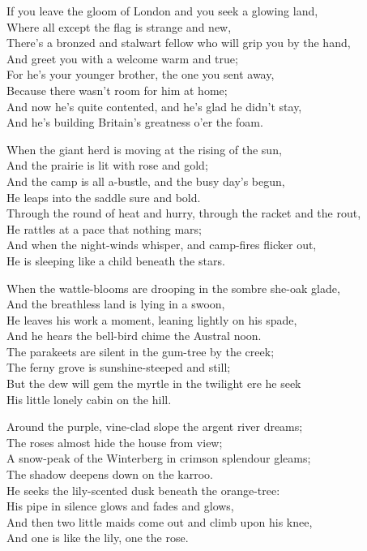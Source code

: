
\begin{poemblock}
If you leave the gloom of London and you seek a glowing land,\\
\idt Where all except the flag is strange and new,\\
There's a bronzed and stalwart fellow who will grip you by the hand,\\
\idt And greet you with a welcome warm and true;\\
For he's your younger brother, the one you sent away,\\
\idt Because there wasn't room for him at home;\\
And now he's quite contented, and he's glad he didn't stay,\\
\idt And he's building Britain's greatness o'er the foam.

When the giant herd is moving at the rising of the sun,\\
\idt And the prairie is lit with rose and gold;\\
And the camp is all a-bustle, and the busy day's begun,\\
\idt He leaps into the saddle sure and bold.\\
Through the round of heat and hurry, through the racket and the rout,\\
\idt He rattles at a pace that nothing mars;\\
And when the night-winds whisper, and camp-fires flicker out,\\
\idt He is sleeping like a child beneath the stars.

When the wattle-blooms are drooping in the sombre she-oak glade,\\
\idt And the breathless land is lying in a swoon,\\
He leaves his work a moment, leaning lightly on his spade,\\
\idt And he hears the bell-bird chime the Austral noon.\\
The parakeets are silent in the gum-tree by the creek;\\
\idt The ferny grove is sunshine-steeped and still;\\
But the dew will gem the myrtle in the twilight ere he seek\\
\idt His little lonely cabin on the hill.

Around the purple, vine-clad slope the argent river dreams;\\
\idt The roses almost hide the house from view;\\
A snow-peak of the Winterberg in crimson splendour gleams;\\
\idt The shadow deepens down on the karroo.\\
He seeks the lily-scented dusk beneath the orange-tree:\\
\idt His pipe in silence glows and fades and glows,\\
And then two little maids come out and climb upon his knee,\\
\idt And one is like the lily, one the rose.


\end{poemblock}
